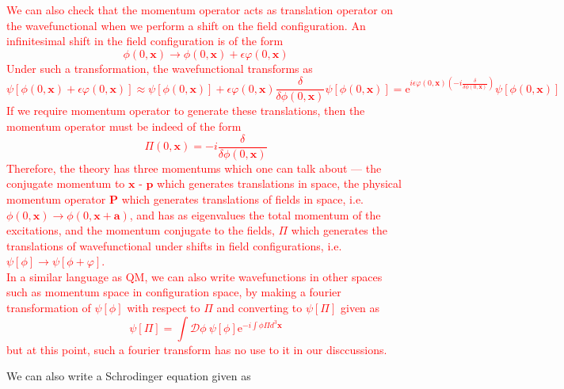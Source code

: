 \documentclass[11pt]{article}
\newcommand{\e}{\mathrm{e}}
\newcommand{\D}{\mathcal{D}}
\numberwithin{equation}{section}
\begin{document}
    \textcolor{red}{
        We can also check that the momentum operator acts as translation operator on the wavefunctional when we perform a shift on the field configuration. An infinitesimal shift in the field configuration is of the form 
        \begin{equation}
            \phi(0, \textbf{x}) \to \phi(0, \textbf{x}) + \epsilon \varphi(0, \textbf{x})
        \end{equation}
        Under such a transformation, the wavefunctional transforms as 
        \begin{equation}
            \psi[\phi(0, \textbf{x}) + \epsilon \varphi(0, \textbf{x})] \approx \psi[\phi(0, \textbf{x})] + \epsilon \varphi(0, \textbf{x})\frac{\delta }{\delta  \phi(0, \textbf{x})}\psi[\phi(0, \textbf{x})] = \e^{i\epsilon\varphi(0, \textbf{x}) \left( -i\frac{\delta}{\delta \phi(0, \textbf{x})} \right)}\psi[\phi(0, \textbf{x})]
        \end{equation}
        If we require momentum operator to generate these translations, then the momentum operator must be indeed of the form 
        \begin{equation}
            \Pi(0, \textbf{x}) = -i\frac{\delta}{\delta \phi(0, \textbf{x})}
        \end{equation}
        Therefore, the theory has three momentums which one can talk about — the conjugate momentum to \(\textbf{x}\) - \(\textbf{p}\) which generates translations in space, the physical momentum operator \(\textbf{P}\) which generates translations of fields in space, i.e. \(\phi(0, \textbf{x}) \to \phi(0, \textbf{x} + \textbf{a})\), and has as eigenvalues the total momentum of the excitations, and the momentum conjugate to the fields, \(\Pi\) which generates the translations of wavefunctional under shifts in field configurations, i.e. \(\psi[\phi] \to \psi[\phi + \varphi]\).\\
        In a similar language as QM, we can also write wavefunctions in other spaces such as momentum space in configuration space, by making a fourier transformation of \(\psi[\phi]\) with respect to \(\Pi\) and converting to \(\psi[\Pi]\) given as 
        \begin{equation}
            \psi[\Pi] = \int \D \phi ~\psi[\phi] \e^{-i\int \phi \Pi d^3\textbf{x}}
        \end{equation}
        but at this point, such a fourier transform has no use to it in our disccussions.\\
    }

    We can also write a Schrodinger equation given as 
\end{document}
